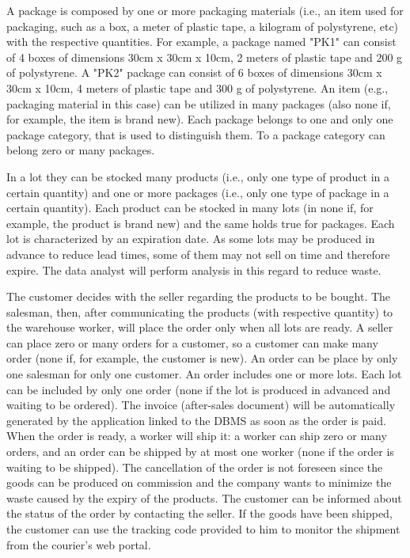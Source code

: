 A package is composed by one or more packaging materials (i.e., an item used for packaging, such as a box, a meter of plastic tape, a kilogram of polystyrene, etc) with the respective quantities. For example, a package named "PK1" can consist of 4 boxes of dimensions 30cm x 30cm x 10cm, 2 meters of plastic tape and 200 g of polystyrene. A "PK2" package can consist of 6 boxes of dimensions 30cm x 30cm x 10cm, 4 meters of plastic tape and 300 g of polystyrene. An item (e.g., packaging material in this case) can be utilized in many packages (also none if, for example, the item is brand new). Each package belongs to one and only one package category, that is used to distinguish them. To a package category can belong zero or many packages.

In a lot they can be stocked many products (i.e., only one type of product in a certain quantity) and one or more packages (i.e., only one type of package in a certain quantity). Each product can be stocked in many lots (in none if, for example, the product is brand new) and the same holds true for packages. Each lot is characterized by an expiration date. As some lots may be produced in advance to reduce lead times, some of them may not sell on time and therefore expire. The data analyst will perform analysis in this regard to reduce waste.

The customer decides with the seller regarding the products to be bought. The salesman, then, after communicating the products (with respective quantity) to the warehouse worker, will place the order only when all lots are ready. A seller can place zero or many orders for a customer, so a customer can make many order (none if, for example, the customer is new). An order can be place by only one salesman for only one customer. An order includes one or more lots. Each lot can be included by only one order (none if the lot is produced in advanced and waiting to be ordered). The invoice (after-sales document) will be automatically generated by the application linked to the DBMS as soon as the order is paid.
When the order is ready, a worker will ship it: a worker can ship zero or many orders, and an order can be shipped by at most one worker (none if the order is waiting to be shipped). The cancellation of the order is not foreseen since the goods can be produced on commission and the company wants to minimize the waste caused by the expiry of the products. The customer can be informed about the status of the order by contacting the seller. If the goods have been shipped, the customer can use the tracking code provided to him to monitor the shipment from the courier's web portal.
